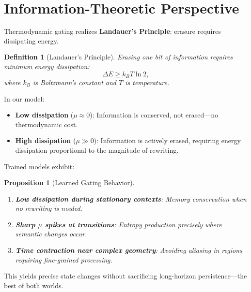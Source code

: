 \documentclass[12pt,letterpaper,twoside]{article}
\newtheorem{definition}{Definition}[section]
\newtheorem{prop}{Proposition}[section]
\begin{document}
\section{Information-Theoretic Perspective}

Thermodynamic gating realizes \textbf{Landauer's Principle}: erasure requires dissipating energy.

\begin{definition}[Landauer's Principle]
Erasing one bit of information requires minimum energy dissipation:
\[
\Delta E \geq k_B T \ln 2,
\]
where $k_B$ is Boltzmann's constant and $T$ is temperature.
\end{definition}

In our model:
\begin{itemize}
\item \textbf{Low dissipation} ($\mu \approx 0$): Information is conserved, not erased---no thermodynamic cost.
\item \textbf{High dissipation} ($\mu \gg 0$): Information is actively erased, requiring energy dissipation proportional to the magnitude of rewriting.
\end{itemize}

Trained models exhibit:

\begin{prop}[Learned Gating Behavior]
\begin{enumerate}
\item \textbf{Low dissipation during stationary contexts}: Memory conservation when no rewriting is needed.
\item \textbf{Sharp $\mu$ spikes at transitions}: Entropy production precisely where semantic changes occur.
\item \textbf{Time contraction near complex geometry}: Avoiding aliasing in regions requiring fine-grained processing.
\end{enumerate}
\end{prop}

This yields precise state changes without sacrificing long-horizon persistence—the best of both worlds.
\end{document}
